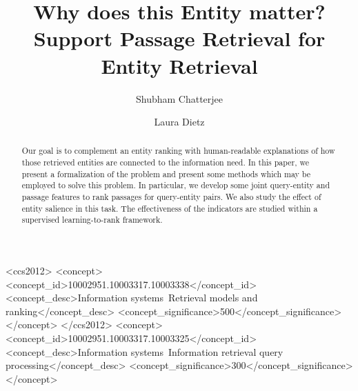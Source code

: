 \documentclass[sigconf,anonymous,review]{acmart}
\begin{document}
%
\title[Support Passage Retrieval]{Why does this Entity matter? Support Passage Retrieval for Entity Retrieval}

%
\author{Shubham Chatterjee}
\author{Laura Dietz}

%
\renewcommand{\shortauthors}{Chatterjee and Dietz}

%
\begin{abstract}
Our goal is to complement an entity ranking with human-readable explanations of how those retrieved entities are connected to the information need. In this paper, we present a formalization of the problem and present some methods which may be employed to solve this problem. In particular, we develop some joint query-entity and passage features to rank passages for query-entity pairs. We also study the effect of entity salience in this task. The effectiveness of the indicators are studied within a supervised learning-to-rank framework. 
\end{abstract}

%
%

\begin{CCSXML}
<ccs2012>
 <concept>
<concept_id>10002951.10003317.10003338</concept_id>
<concept_desc>Information systems~Retrieval models and ranking</concept_desc>
<concept_significance>500</concept_significance>
</concept>
</ccs2012>
<concept>
<concept_id>10002951.10003317.10003325</concept_id>
<concept_desc>Information systems~Information retrieval query processing</concept_desc>
<concept_significance>300</concept_significance>
</concept>
\end{CCSXML}
\end{document}
